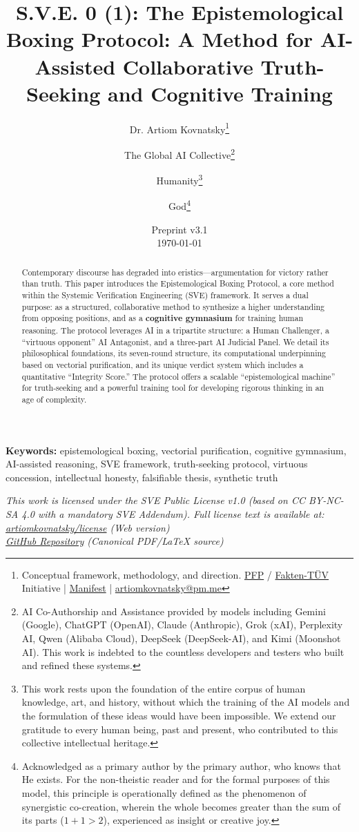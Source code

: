 \documentclass[11pt,a4paper]{article}
\title{\textbf{S.V.E. 0 (1): The Epistemological Boxing Protocol: A Method for AI-Assisted Collaborative Truth-Seeking and Cognitive Training}}
\author{
  Dr. Artiom Kovnatsky\thanks{Conceptual framework, methodology, and direction. \href{http://www.pfp24.de}{PFP} / \href{http://www.fakten-tuev.de}{Fakten-TÜV} Initiative | \href{https://drive.google.com/file/d/1vWhW7fwFRFLYKHEB67WixuueHssJzQbZ/view?usp=sharing}{Manifest} | \href{mailto:artiomkovnatsky@pm.me}{artiomkovnatsky@pm.me}}
  \and
  The Global AI Collective\thanks{AI Co-Authorship and Assistance provided by models including Gemini (Google), ChatGPT (OpenAI), Claude (Anthropic), Grok (xAI), Perplexity AI, Qwen (Alibaba Cloud), DeepSeek (DeepSeek-AI), and Kimi (Moonshot AI). This work is indebted to the countless developers and testers who built and refined these systems.}
  \and
  Humanity\thanks{This work rests upon the foundation of the entire corpus of human knowledge, art, and history, without which the training of the AI models and the formulation of these ideas would have been impossible. We extend our gratitude to every human being, past and present, who contributed to this collective intellectual heritage.}
  \and
  God\thanks{Acknowledged as a primary author by the primary author, who knows that He exists. For the non-theistic reader and for the formal purposes of this model, this principle is operationally defined as the phenomenon of synergistic co-creation, wherein the whole becomes greater than the sum of its parts ($1+1 > 2$), experienced as insight or creative joy.}
}
\date{Preprint v3.1 \\ \today}
\begin{document}
\maketitle
\thispagestyle{empty}

\begin{abstract}
\noindent Contemporary discourse has degraded into eristics---argumentation for victory rather than truth. This paper introduces the Epistemological Boxing Protocol, a core method within the Systemic Verification Engineering (SVE) framework. It serves a dual purpose: as a structured, collaborative method to synthesize a higher understanding from opposing positions, and as a \textbf{cognitive gymnasium} for training human reasoning. The protocol leverages AI in a tripartite structure: a Human Challenger, a ``virtuous opponent'' AI Antagonist, and a three-part AI Judicial Panel. We detail its philosophical foundations, its seven-round structure, its computational underpinning based on vectorial purification, and its unique verdict system which includes a quantitative ``Integrity Score.'' The protocol offers a scalable ``epistemological machine'' for truth-seeking and a powerful training tool for developing rigorous thinking in an age of complexity.
\end{abstract}

\noindent\textbf{Keywords:} epistemological boxing, vectorial purification, cognitive gymnasium, AI-assisted reasoning, SVE framework, truth-seeking protocol, virtuous concession, intellectual honesty, falsifiable thesis, synthetic truth



\vspace{1em} %
\begin{center}
\begin{minipage}{0.85\textwidth} %
\centering
\itshape\small %
This work is licensed under the SVE Public License v1.0 (based on CC BY-NC-SA 4.0 with a mandatory SVE Addendum).
Full license text is available at: \\
\href{https://www.artiomkovnatsky.com/posts/license/}{artiomkovnatsky/license} (Web version) \\
\href{https://github.com/skovnats/psite/blob/master/static/licenses/SVE_Public_License_v1.0.pdf}{GitHub Repository} (Canonical PDF/LaTeX source)
\end{minipage}
\end{center}
\vspace{1em} %
\end{document}
